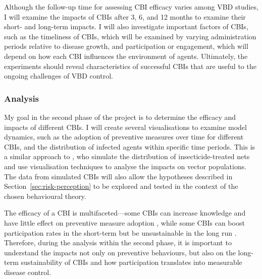 Although the follow-up time for assessing CBI efficacy varies among VBD studies, I will examine the impacts of CBIs after 3, 6, and 12 months to examine their short- and long-term impacts. I will also investigate important factors of CBIs, such as the timeliness of CBIs, which will be examined by varying administration periods relative to disease growth, and participation or engagement, which will depend on how each CBI influences the environment of agents. Ultimately, the experiments should reveal characteristics of successful CBIs that are useful to the ongoing challenges of VBD control.

\subsubsection{Analysis}

My goal in the second phase of the project is to determine the efficacy and impacts of different CBIs. I will create several visualisations to examine model dynamics, such as the adoption of preventive measures over time for different CBIs, and the distribution of infected agents within specific time periods. This is a similar approach to \citet{selvaraj_vector_2020}, who simulate the distribution of insecticide-treated nets and use visualisation techniques to analyse the impacts on vector populations. The data from simulated CBIs will also allow the hypotheses described in Section~\ref{sec:risk-perception} to be explored and tested in the context of the chosen behavioural theory.

The efficacy of a CBI is multifaceted---some CBIs can increase knowledge and have little effect on preventive measure adoption \cite{sulistyawati_dengue_2019}, while some CBIs can boost participation rates in the short-term but be unsustainable in the long run \cite{tapia-conyer_community_2012, rivera_adoption_2023, winch_effectiveness_1992}. Therefore, during the analysis within the second phase, it is important to understand the impacts not only on preventive behaviours, but also on the long-term sustainability of CBIs and how participation translates into measurable disease control.

